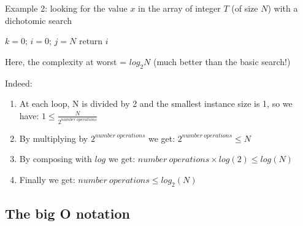 \documentclass{beamer}[10pt, usepdftitle=false, handout]
\begin{document}
	\begin{frame}
	
	Example 2: looking for the value $x$ in the array of integer $T$	 (of size $N$) with a dichotomic search
	
	\begin{center}    
    \scalebox{0.75} {
    \begin{algorithm}[H]
	$k=0$; $i=0$; $j=N$\;
 	return $i$\;
 	\caption{pseudo-code of dichotomic search algorithm}
	\end{algorithm}	
	}
	\end{center} 
	
	Here, the complexity at worst = $log_2N$	(much better than the basic search!)
	
	\end{frame}	
	
	\begin{frame}
	
	Indeed:
	
	\begin{enumerate}
		\item {At each loop, N is divided by 2 and the smallest instance size is 1, so we have: $1 \leq \frac{N}{2^{number\ operations}}$}
		\item {By multiplying by $2^{number\ operations}$ we get: $2^{number\ operations} \leq N$}
		\item {By composing with $log$ we get: $number\ operations \times log(2) \leq log(N)$}
		\item {Finally we get: $number\ operations \leq log_2(N)$}	
	\end{enumerate}	 	
	
	\end{frame}	
		
	\subsection{The big O notation}	
	
\end{document}
